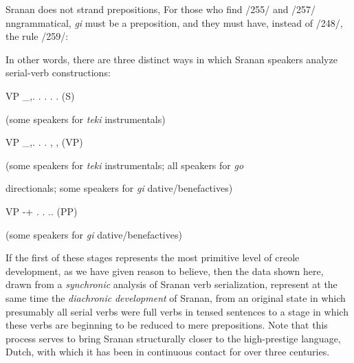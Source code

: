 Sranan does not strand prepositions, For those who find /255/ and /257/ nngrammatical, \textit{gi }must be a preposition, and they must have, instead of /248/, the rule /259/:
 

\ea\label{ex:261}

\z

In other words, there are three distinct ways in which Sranan speakers analyze serial-verb constructions:

\ea\label{ex:262}
 VP \_,. . . . . (S)  

(some speakers for \textit{teki} instrumentals)

VP \_,. . . , , (VP)

(some speakers for \textit{teki }instrumentals; all speakers for \textit{go}

directionals; some speakers for \textit{gi} dative/benefactives)

VP {}-+ . . .. (PP)

(some speakers for \textit{gi} dative/benefactives)

\z

If the first of these stages represents the most primitive level of creole development, as we have given reason to believe, then the data shown here, drawn from a \textit{synchronic} analysis of Sranan verb serialization, represent at the same time the \textit{diachronic} \textit{development} of Sranan, from an original state in which presumably all serial verbs were full verbs in tensed sentences to a stage in which these verbs are beginning to be reduced to mere prepositions. Note that this process serves to bring Sranan structurally closer to the high-prestige language, Dutch, with which it has been in continuous contact for over three centuries.


